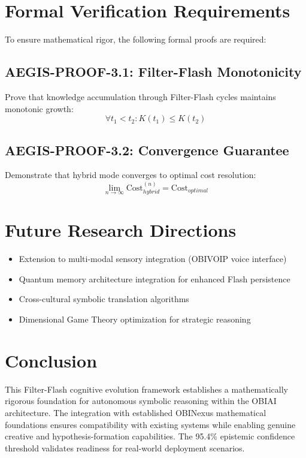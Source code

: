 \documentclass[11pt]{article}
\begin{document}
\section{Formal Verification Requirements}

To ensure mathematical rigor, the following formal proofs are required:

\subsection{AEGIS-PROOF-3.1: Filter-Flash Monotonicity}
Prove that knowledge accumulation through Filter-Flash cycles maintains monotonic growth:
\begin{equation}
\forall t_1 < t_2: K(t_1) \leq K(t_2)
\end{equation}

\subsection{AEGIS-PROOF-3.2: Convergence Guarantee}
Demonstrate that hybrid mode converges to optimal cost resolution:
\begin{equation}
\lim_{n \rightarrow \infty} \text{Cost}_{hybrid}^{(n)} = \text{Cost}_{optimal}
\end{equation}

\section{Future Research Directions}

\begin{itemize}
\item Extension to multi-modal sensory integration (OBIVOIP voice interface)
\item Quantum memory architecture integration for enhanced Flash persistence
\item Cross-cultural symbolic translation algorithms
\item Dimensional Game Theory optimization for strategic reasoning
\end{itemize}

\section{Conclusion}

This Filter-Flash cognitive evolution framework establishes a mathematically rigorous foundation for autonomous symbolic reasoning within the OBIAI architecture. The integration with established OBINexus mathematical foundations ensures compatibility with existing systems while enabling genuine creative and hypothesis-formation capabilities. The 95.4\% epistemic confidence threshold validates readiness for real-world deployment scenarios.
\end{document}
